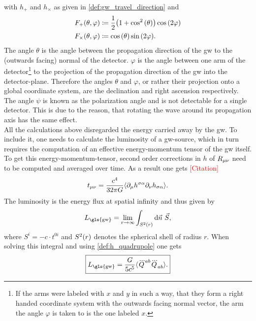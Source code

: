 with $h_+$ and $h_\times$ as given in \eqref{def:gw_travel_direction} and
\begin{align}
F_+{\left( \theta, \varphi \right)} &\coloneqq \frac{1}{2}{\left( 1+\cos^2{\left( \theta \right)} \right)}\cos{\left( 2\varphi \right)}\nonumber\\
F_\times{\left( \theta, \varphi \right)} &\coloneqq\cos{\left( \theta \right)}\sin{\left( 2\varphi \right)}.
\end{align}
The angle $\theta$ is the angle between the propagation direction of the \gls{gw} to the (outwards facing) normal of the detector. $\varphi$ is the angle between one arm of the detector\footnote{If the arms were labeled with $x$ and $y$ in such a way, that they form a right handed coordinate system with the outwards facing normal vector, the arm the angle $\varphi$ is taken to is the one labeled $x$.} to the projection of the propagation direction of the \gls{gw} into the detector-plane. Therefore the angles $\theta$ and $\varphi$, or rather their projection onto a global coordinate system, are the declination and right ascension respectively. The angle $\psi$ is known as the polarization angle and is not detectable for a single detector. This is due to the reason, that rotating the wave around its propagation axis has the same effect.\medskip\\
All the calculations above disregarded the energy carried away by the \gls{gw}. To include it, one needs to calculate the luminosity of a \gls{gw}-source, which in turn requires the computation of an effective energy-momentum tensor of the \gls{gw} itself.\\
To get this energy-momentum-tensor, second order corrections in $h$ of $R_{\mu\nu}$ need to be computed and averaged over time. As a result one gets \textcolor{red}{[Citation]}
\begin{equation}
t_{\mu\nu} = \frac{c^4}{32\pi G}\langle\partial_\mu h^{\sigma\alpha}\partial_\nu h_{\sigma\alpha}\rangle.
\end{equation}
The luminosity is the energy flux at spatial infinity and thus given by
\begin{equation}
L_\text{\gls{gw}} = \lim_{r\to\infty}\int_{S^2\lr{r}}\diff\vec{n}\ \vec{S},
\end{equation}
where $S^i=-c\cdot t^{0i}$ and $S^2{\left( r \right)}$ denotes the spherical shell of radius $r$. When solving this integral and using \eqref{def:h_quadrupole} one gets
\begin{equation}\label{def:luminosity_quadrupole}
\boxed{L_\text{\gls{gw}}=\frac{G}{5c^5}\langle\dddot{Q}^{ab}\dddot{Q}_{ab}\rangle.}
\end{equation}
